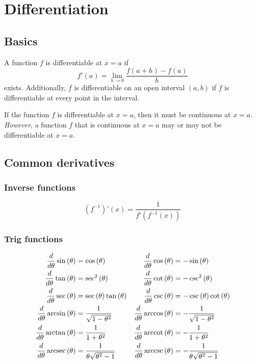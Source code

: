 \documentclass[main.tex]{subfiles}
\begin{document}
\section{Differentiation}
\begin{multicols}{2} \raggedcolumns \setcounter{unbalance}{10}
	\subsection*{Basics}
	\begin{definition}[informal]
	A function \(f\) is differentiable at \(x = a\) if \[f'(a) = \lim_{h \to 0} \frac{f(a+h) - f(a)}{h}\] exists. Additionally, \(f\) is differentiable on an open interval \((a, b)\) if \(f\) is differentiable at every point in the interval.
	\end{definition}
	\begin{note}
	If the function \(f\) is differentiable at \(x = a\), then it must be continuous at \(x = a\). \emph{However}, a function \(f\) that is continuous at \(x = a\) may or may not be differentiable at \(x = a\).
	\end{note}

	\subsection*{Common derivatives}
	\subsubsection*{Inverse functions}
	\begin{equation*}
		(f^{-1})' (x) = \frac{1}{f'(f^{-1}(x))}
	\end{equation*}
	\subsubsection*{Trig functions}
	\begin{align*}
		\frac{d}{d\theta} \sin{(\theta)} &= \cos{(\theta)} & \frac{d}{d\theta} \cos{(\theta)} &= -\sin{(\theta)} \\
		\frac{d}{d\theta} \tan{(\theta)} &= \sec^2{(\theta)} &  \frac{d}{d\theta} \cot{(\theta)} &= -\csc^2{(\theta)} \\
		\frac{d}{d\theta} \sec{(\theta)} &= \sec{(\theta)}\tan{(\theta)} & \frac{d}{d\theta} \csc{(\theta)} &= -\csc{(\theta)}\cot{(\theta)} \\
		\frac{d}{d\theta} \arcsin{(\theta)} &= \frac{1}{\sqrt{1 - \theta^2}} & \frac{d}{d\theta} \arccos{(\theta)} &= -\frac{1}{\sqrt{1 - \theta^2}} \\
		\frac{d}{d\theta} \arctan{(\theta)} &= \frac{1}{1 + \theta^2} & \frac{d}{d\theta} \operatorname{arccot}{(\theta)} &= -\frac{1}{1 + \theta^2} \\
		\frac{d}{d\theta} \operatorname{arcsec}{(\theta)} &= \frac{1}{\theta \sqrt{\theta^2 - 1}} & \frac{d}{d\theta} \operatorname{arccsc}{(\theta)} &= -\frac{1}{\theta \sqrt{\theta^2 - 1}}
	\end{align*}


\end{multicols}
\end{document}
